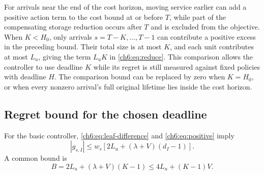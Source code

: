 \documentclass[11pt]{article}
\theoremstyle{plain}
\theoremstyle{remark}
\numberwithin{equation}{section}
\begin{document}
For arrivals near the end of the cost horizon, moving service earlier can
add a positive action term to the cost bound at or before $T$, while part
of the compensating storage reduction occurs after $T$ and is excluded
from the objective. When $K<H_0$, only arrivals $s=T-K,\ldots,T-1$ can
contribute a positive excess in the preceding bound. Their total size is at
most $K$, and each unit contributes at most $L_u$, giving the term $L_uK$ in
\eqref{ch6:eq:reduce}. This comparison allows the controller to use deadline
$K$ while its regret is still measured against fixed policies with deadline
$H$. The comparison bound can be replaced by zero when $K=H_0$, or when
every nonzero arrival's full original lifetime lies inside the cost horizon.

\subsection{Regret bound for the chosen deadline}
For the basic controller, \eqref{ch6:eq:leaf-difference} and
\eqref{ch6:eq:positive} imply
\begin{equation}\label{ch6:eq:positive-node}
 |g_{s,I}|\le w_s[2L_u+(\lambda+V)(d_I-1)].
\end{equation}
A common bound is
\begin{equation}\label{ch6:eq:positive-B}
 B=2L_u+(\lambda+V)(K-1)\le4L_u+(K-1)V.
\end{equation}
\end{document}
